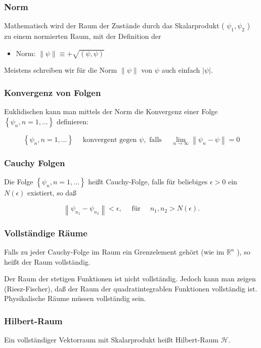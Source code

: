 \documentclass[10pt, letterpaper]{article}
\begin{document}
\subsubsection*{Norm}
Mathematisch wird der Raum der Zustände durch das Skalarprodukt ( $\psi_{1}, \psi_{2}$ ) zu einem normierten Raum, mit der Definition der

\begin{itemize}
  \item Norm: $\|\psi\| \equiv+\sqrt{(\psi, \psi)}$
\end{itemize}

Meistens schreiben wir für die Norm $\|\psi\|$ von $\psi$ auch einfach $|\psi|$.

\subsubsection*{Konvergenz von Folgen}
Euklidischen kann man mittels der Norm die Konvergenz einer Folge $\left\{\psi_{n}, n=1, \ldots\right\}$ definieren:

$$
\left\{\psi_{n}, n=1, \ldots\right\} \quad \text { konvergent gegen } \psi, \text { falls } \quad \lim _{n \rightarrow \infty}\left\|\psi_{n}-\psi\right\|=0
$$

\subsubsection*{Cauchy Folgen}
Die Folge $\left\{\psi_{n}, n=1, \ldots\right\}$ heißt Cauchy-Folge, falls für beliebiges $\epsilon>0$ ein $N(\epsilon)$ existiert, so daß

$$
\left\|\psi_{n_{1}}-\psi_{n_{2}}\right\|<\epsilon, \quad \text { für } \quad n_{1}, n_{2}>N(\epsilon) .
$$

\subsubsection*{Vollständige Räume}
Falls zu jeder Cauchy-Folge im Raum ein Grenzelement gehört (wie im $\mathbb{R}^{n}$ ), so heißt der Raum vollständig.

Der Raum der stetigen Funktionen ist nicht vollständig. Jedoch kann man zeigen (Riesz-Fischer), daß der Raum der quadratintegrablen Funktionen vollständig ist. Physikalische Räume müssen vollständig sein.

\subsubsection*{Hilbert-Raum}
Ein vollständiger Vektorraum mit Skalarprodukt heißt Hilbert-Raum $\mathcal{H}$.
\end{document}
